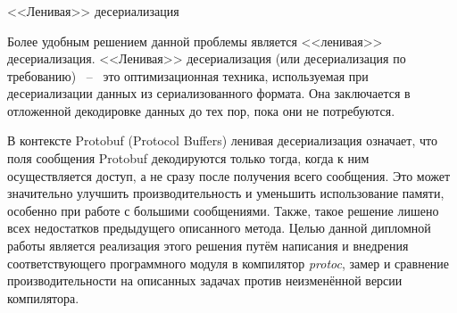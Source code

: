 \subsubsection{} <<Ленивая>> десериализация

Более удобным решением данной проблемы является <<ленивая>> десериализация.
<<Ленивая>> десериализация (или десериализация по требованию) ~--~ это оптимизационная техника, используемая при десериализации данных из сериализованного формата. 
Она заключается в отложенной декодировке данных до тех пор, пока они не потребуются.

В контексте Protobuf (Protocol Buffers) ленивая десериализация означает, что поля сообщения Protobuf декодируются только тогда, когда к ним осуществляется доступ, а не сразу после получения всего сообщения. 
Это может значительно улучшить производительность и уменьшить использование памяти, особенно при работе с большими сообщениями.
Также, такое решение лишено всех недостатков предыдущего описанного метода.
Целью данной дипломной работы является реализация этого решения путём написания и внедрения соответствующего программного модуля в компилятор \textit{protoc}, замер и сравнение производительности на описанных задачах против неизменённой версии компилятора.
